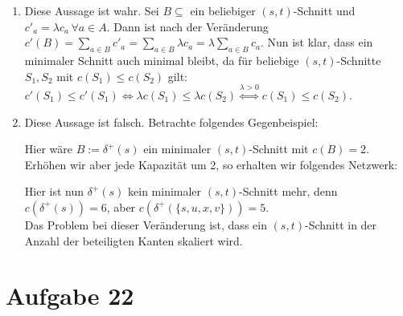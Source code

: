 \documentclass[a4paper,12pt,german]{scrartcl}
\begin{document}
\begin{enumerate}
  \item Diese Aussage ist wahr. Sei $B\subseteq$ ein beliebiger $(s,t)$-Schnitt und $c'_a=\lambda c_a\,\forall a\in A$. Dann ist nach der Veränderung $c'(B)=\sum\limits_{a\in B}c'_a=\sum\limits_{a\in B}\lambda c_a=\lambda\sum\limits_{a\in B}c_a$. Nun ist klar, dass ein minimaler Schnitt auch minimal bleibt, da für beliebige $(s,t)$-Schnitte $S_1,S_2$ mit $c(S_1)\leq c(S_2)$ gilt: $c'(S_1)\leq c'(S_1)\iff \lambda c(S_1)\leq \lambda c(S_2)\stackrel{\lambda>0}{\iff}c(S_1)\leq c(S_2)$.
  \item Diese Aussage ist falsch. Betrachte folgendes Gegenbeispiel:
    \begin{center}
    \end{center}
    Hier wäre $B:=\delta^+(s)$ ein minimaler $(s,t)$-Schnitt mit $c(B)=2$. Erhöhen wir aber jede Kapazität um 2, so erhalten wir folgendes Netzwerk:
        \begin{center}
    \end{center}
    Hier ist nun $\delta^+(s)$ kein minimaler $(s,t)$-Schnitt mehr, denn $c(\delta^+(s))=6$, \linebreak aber $c(\delta^+(\{s,u,x,v\}))=5$.\\
    Das Problem bei dieser Veränderung ist, dass  ein $(s,t)$-Schnitt in der Anzahl der beteiligten Kanten skaliert wird.
  \end{enumerate}  
  
\section*{Aufgabe 22}
\end{document}
